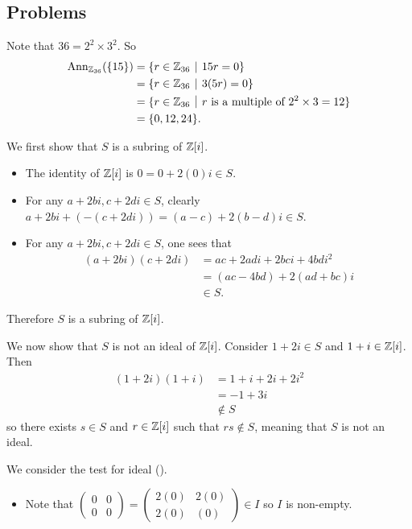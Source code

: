 \subsection*{Problems}
\begin{questions}
    \item Note that $36 = 2^2 \times 3^2$. So
    \begin{align*}
        \Ann{\Z_{36}}{\{15\}} &= \{r \in \Z_{36} \vert 15r = 0\}\\
        &= \{r \in \Z_{36} \vert 3(5r) = 0\}\\
        &= \{r \in \Z_{36} \vert r \text{ is a multiple of }2^2\times3 = 12\}\\
        &= \{0,12,24\}.
    \end{align*}

    \item We first show that $S$ is a subring of $\mathbb{Z}[i]$.
    \begin{itemize}
        \item The identity of $\mathbb{Z}[i]$ is $0 = 0 + 2(0)i \in S$.
        \item For any $a+2bi, c+2di \in S$, clearly $a+2bi + (-(c + 2di)) = (a-c) + 2(b-d)i \in S$.
        \item For any $a+2bi, c+2di \in S$, one sees that
        \begin{align*}
            (a+2bi)(c+2di) &= ac + 2adi + 2bci + 4bdi^2\\
            &= (ac-4bd) + 2(ad+bc)i\\
            &\in S.
        \end{align*}
    \end{itemize}
    Therefore $S$ is a subring of $\mathbb{Z}[i]$.

    We now show that $S$ is not an ideal of $\mathbb{Z}[i]$. Consider $1+2i \in S$ and $1+i \in \mathbb{Z}[i]$. Then
    \begin{align*}
        (1+2i)(1+i) &= 1+i+2i+2i^2\\
        &= -1 + 3i\\
        &\notin S
    \end{align*}
    so there exists $s \in S$ and $r \in \mathbb{Z}[i]$ such that $rs \notin S$, meaning that $S$ is not an ideal.

    \item We consider the test for ideal ().
    \begin{itemize}
        \item Note that $\begin{pmatrix}0&0\\0&0\end{pmatrix}=\begin{pmatrix}2(0)&2(0)\\2(0)&(0)\end{pmatrix} \in I$ so $I$ is non-empty.


\end{itemize}
\end{questions}
